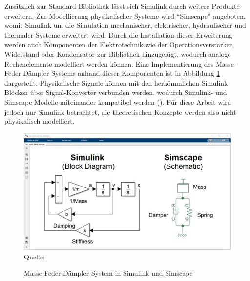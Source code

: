 Zusätzlich zur Standard-Bibliothek lässt sich Simulink durch weitere Produkte erweitern. Zur Modellierung physikalischer Systeme wird \zb "`Simscape"' angeboten, womit Simulink um die Simulation mechanischer, elektrischer, hydraulischer und thermaler Systeme erweitert wird. Durch die Installation dieser Erweiterung werden auch Komponenten der Elektrotechnik wie der Operationsverstärker, Widerstand oder Kondensator zur Bibliothek hinzugefügt, wodurch analoge Rechenelemente modelliert werden können. Eine Implementierung des Masse-Feder-Dämpfer Systems anhand dieser Komponenten ist in Abbildung \ref{fig:Simulink und Simscape} dargestellt. Physikalische Signale können mit den herkömmlichen Simulink-Blöcken über Signal-Konverter verbunden werden, wodurch Simulink- und Simscape-Modelle miteinander kompatibel werden (\cite{website:mathworks:simscape}). Für diese Arbeit wird jedoch nur Simulink betrachtet, die theoretischen Konzepte werden also nicht physikalisch modelliert.

\begin{figure}[h]
  \caption{Masse-Feder-Dämpfer System in Simulink und Simscape}
  \includegraphics[width=\textwidth]{abbildungen/simulink_simscape.jpg}
  \\
  Quelle: \cite{MathWorksSimscape}
  \label{fig:Simulink und Simscape}
\end{figure}
